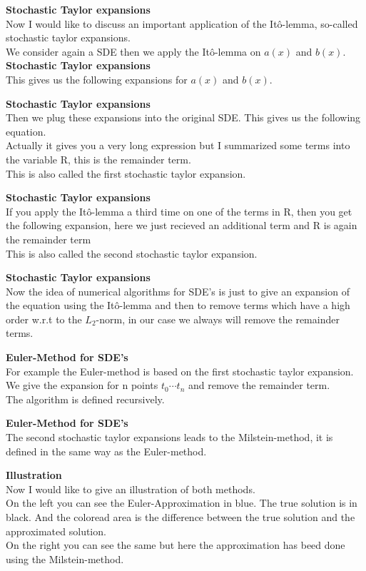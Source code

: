 \documentclass[10pt,a4paper,titlepage, openany]{memoir} %
\begin{document}
\newpage

\textbf{Stochastic Taylor expansions}\\
Now I would like to discuss an important application of the It\^o-lemma, so-called stochastic taylor expansions.\\
We consider again a SDE then we apply the It\^o-lemma on \(a(x)\) and \(b(x)\).\\

\textbf{Stochastic Taylor expansions}\\
This gives us the following expansions for \(a(x)\) and \(b(x)\).

\textbf{Stochastic Taylor expansions}\\
Then we plug these expansions into the original SDE. This gives us the following equation.\\
Actually it gives you a very long expression but I summarized some terms into the variable R, this is the remainder term.\\
This is also called the first stochastic taylor expansion.

\textbf{Stochastic Taylor expansions}\\
If you apply the It\^o-lemma a third time on one of the terms in R, then you get the following expansion, here we just recieved an additional term and R is again the remainder term\\
This is also called the second stochastic taylor expansion.

\textbf{Stochastic Taylor expansions}\\
Now the idea of numerical algorithms for SDE's is just to give an expansion of the equation using the It\^o-lemma and then to remove terms which have a high order w.r.t to the \(L_2\)-norm, in our case we always will remove the remainder terms.


\textbf{Euler-Method for SDE's}\\
For example the Euler-method is based on the first stochastic taylor expansion. We give the expansion for n points \(t_0\cdots t_n\) and remove the remainder term.\\
The algorithm is defined recursively.

\textbf{Euler-Method for SDE's}\\
The second stochastic taylor expansions leads to the Milstein-method, it is defined in the same way as the Euler-method.

\newpage


\textbf{Illustration}\\
Now I would like to give an illustration of both methods.\\
On the left you can see the Euler-Approximation in blue. The true solution is in black. And the coloread area is the difference between the true solution and the approximated solution.\\
On the right you can see the same but here the approximation has beed done using the Milstein-method.\\
\end{document}
